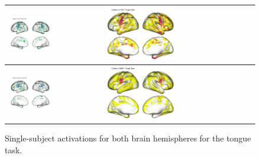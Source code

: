 \documentclass{article}
\begin{document}
\begin{figure}
\begin{tabularx}{\textwidth}{|X|X|}
			\includegraphics[width=0.48\textwidth]{plots/603_subject_111312_tongue_task_activations_classical.png} &
			\includegraphics[width=0.48\textwidth]{plots/603_subject_111312_tongue_task_activations.png} \\ \hline
			\includegraphics[width=0.48\textwidth]{plots/603_subject_114823_tongue_task_activations_classical.png} &
			\includegraphics[width=0.48\textwidth]{plots/603_subject_114823_tongue_task_activations.png} \\ \hline
		\end{tabularx}
		\caption{Single-subject activations for both brain hemispheres for the tongue task.}
		\label{fig:tongue_act_single_subject}
	\end{figure}
\end{document}
